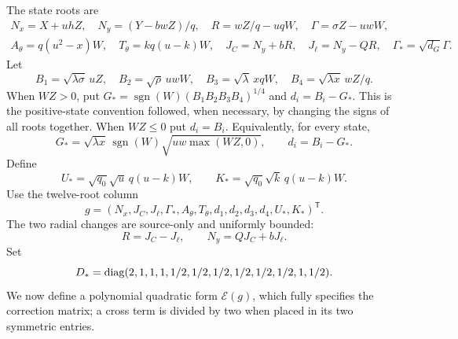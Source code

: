 \documentclass[11pt]{article}
\begin{document}
The state roots are
\[
\begin{gathered}
 N_x=X+uhZ,\quad N_y=(Y-bwZ)/q,\quad
 R=wZ/q-uqW,\quad \Gamma=\sigma Z-uwW,\\
 A_\theta=q(u^2-x)W,\quad T_\theta=kq(u-k)W,
 \quad J_C=N_y+bR,\quad J_\ell=N_y-QR,\quad
 \Gamma_*=\sqrt{d_G}\Gamma.
\end{gathered}
\]
Let
\[
 B_1=\sqrt{\lambda\sigma}\,uZ,\quad
 B_2=\sqrt\rho\,uwW,\quad
 B_3=\sqrt\lambda\,xqW,\quad
 B_4=\sqrt{\lambda x}\,wZ/q.
\]
When $WZ>0$, put
$G_*=\operatorname{sgn}(W)(B_1B_2B_3B_4)^{1/4}$ and
$d_i=B_i-G_*$. This is the positive-state convention followed,
when necessary, by changing the signs of all roots together.
When $WZ\le0$
put $d_i=B_i$. Equivalently, for every state,
\[
 G_*=\sqrt{\lambda x}\,\operatorname{sgn}(W)
                \sqrt{uw\max(WZ,0)},\qquad d_i=B_i-G_*.
\]
Define
\[
 U_*=\sqrt{q_0}\sqrt u\,q(u-k)W,
 \qquad K_*=\sqrt{q_0}\sqrt k\,q(u-k)W.
\]
Use the twelve-root column
\[
 g=(N_x,J_C,J_\ell,\Gamma_*,A_\theta,T_\theta,
                         d_1,d_2,d_3,d_4,U_*,K_*)^{\mathsf T}.
\]
The two radial changes are source-only and uniformly bounded:
\[
 R=J_C-J_\ell,\qquad N_y=QJ_C+bJ_\ell.
\]
Set
\[
 D_*={\rm diag}(2,1,1,1,1/2,1/2,1/2,1/2,1/2,1/2,1,1/2).
\]
We now define a polynomial quadratic form $\mathcal E(g)$, which
fully specifies the correction matrix; a cross term is divided by
two when placed in its two symmetric entries.
\end{document}
